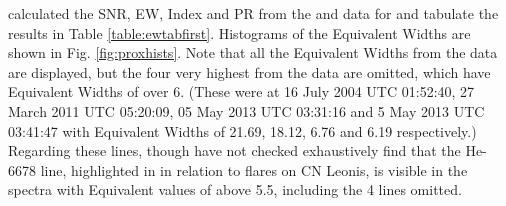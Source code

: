 {\FirstP} calculated the SNR, EW, {\ha} Index and PR from the {\uves} and {\harps} data for {\prox} and tabulate the
results in Table \ref{table:ewtabfirst}. Histograms of the Equivalent Widths are shown in Fig. \ref{fig:proxhists}. Note
that all the Equivalent Widths from the {\uves} data are displayed, but the four very highest from the {\harps} data are
omitted, which have Equivalent Widths of over 6. (These were at 16 July 2004 UTC 01:52:40, 27 March 2011 UTC 05:20:09,
05 May 2013 UTC 03:31:16 and 5 May 2013 UTC 03:41:47 with Equivalent Widths of 21.69, 18.12, 6.76 and 6.19
respectively.) Regarding these lines, though {\Firstp} have not checked exhaustively {\Firstp} find that the He-6678
line, highlighted in \citet[fig. 8]{fuhrmeister08} in relation to flares on CN Leonis, is visible in the spectra with
{\ha} Equivalent values of above 5.5, including the 4 lines omitted.

